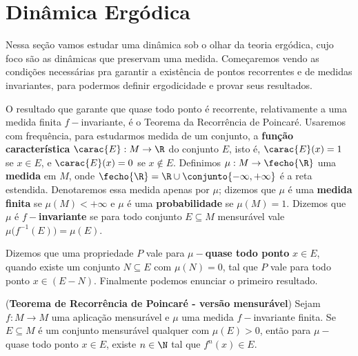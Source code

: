 \section{Dinâmica Ergódica}

Nessa seção vamos estudar uma dinâmica sob o olhar da teoria ergódica, cujo foco são as dinâmicas que preservam uma medida. Começaremos vendo as condições necessárias pra garantir a existência de pontos recorrentes e de medidas invariantes, para podermos definir ergodicidade e provar seus resultados.

O resultado que garante que quase todo ponto é recorrente, relativamente a uma medida finita $f-$invariante, é o Teorema da Recorrência de Poincaré. Usaremos com frequência, para estudarmos medida de um conjunto, a \textbf{função característica} $\carac{E}:M\to \R$ do conjunto $E$, isto é, $\carac{E}(x)=1$ se $x\in E$, e $\carac{E}(x)=0$ se $x\notin E$. Definimos $\mu:M\to\fecho{\R}$ uma \textbf{medida} em $M$, onde $\fecho{\R}=\R\cup\conjunto{-\infty,+\infty}$ é a reta estendida. Denotaremos essa medida apenas por $\mu$; dizemos que $\mu$ é uma \textbf{medida finita} se $\mu(M)<+\infty$ e $\mu$ é uma \textbf{probabilidade} se $\mu(M)=1$. Dizemos que $\mu$ é \textbf{$f-$invariante} se para todo conjunto $E\subseteq M$ mensurável vale $\mu\big(f^{-1}(E)\big)=\mu(E)$.

Dizemos que uma propriedade $P$ vale para \textbf{$\mu-$quase todo ponto} $x\in E$, quando existe um conjunto $N\subseteq E$ com $\mu(N)=0$, tal que $P$ vale para todo ponto $x\in (E-N)$. Finalmente podemos enunciar o primeiro resultado.

\begin{teorema}\label{trp_vm} (\textbf{Teorema de Recorrência de Poincaré - versão mensurável}) Sejam $f:M\to M$ uma aplicação mensurável e $\mu$ uma medida $f-$invariante finita. Se $E\subseteq M$ é um conjunto mensurável qualquer com $\mu(E)>0$, então para $\mu-$quase todo ponto $x\in E$, existe $n\in\N$ tal que $f^n(x)\in E$.
\end{teorema}

